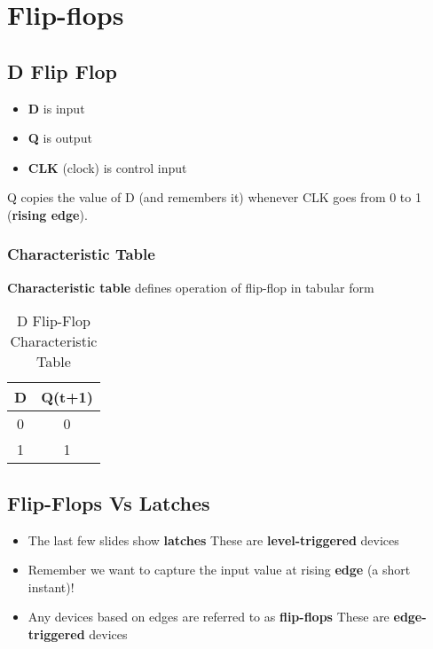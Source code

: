 \section{Flip-flops}
\subsection{D Flip Flop}
\begin{itemize}
	\item\textbf{D} is input
	\item\textbf{Q} is output
	\item\textbf{CLK} (clock) is control input	
\end{itemize}
Q copies the value of D (and remembers it) whenever CLK goes from 0 to 1 (\textbf{rising edge}).

\subsubsection{Characteristic Table}
\textbf{Characteristic table} defines operation of flip-flop in tabular form
\begin{table}[H]
	\centering\caption{D Flip-Flop Characteristic Table}
	\begin{tabular}{c|c}
		D & Q(t+1)\\\hline
		0 & 0\\
		1 & 1
	\end{tabular}
\end{table}

\subsection{Flip-Flops Vs Latches}
\begin{itemize}
	\item The last few slides show \textbf{latches}
	\subitem These are \textbf{level-triggered} devices
	\item Remember we want to capture the input value at rising \textbf{edge} (a short instant)!
	\item Any devices based on edges are referred to as \textbf{flip-flops}
	\subitem These are \textbf{edge-triggered} devices	
\end{itemize}
